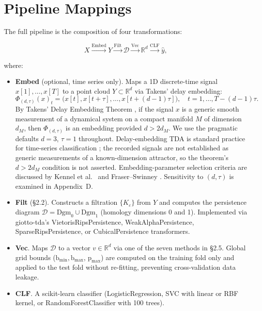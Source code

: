 \documentclass[12pt, a4paper]{report}
\newcommand{\Dgm}{\mathrm{Dgm}}
\newcommand{\birth}{\mathrm{b}}
\newcommand{\pers}{\mathrm{p}}
\newcommand{\R}{\mathbb{R}}
\theoremstyle{definition}
\theoremstyle{plain}
\theoremstyle{remark}
\begin{document}
\section{Pipeline Mappings}

The full pipeline is the composition of four transformations:

\begin{equation}
  X \xrightarrow{\text{Embed}} Y \xrightarrow{\text{Filt}}
  \mathcal{D} \xrightarrow{\text{Vec}} \R^d
  \xrightarrow{\text{CLF}} \hat{y},
  \label{eq:pipeline_map}
\end{equation}

where:

\begin{itemize}
  \item \textbf{Embed} (optional, time series only). Maps a 1D
    discrete-time signal $x[1], \dots, x[T]$ to a point cloud
    $Y \subset \R^d$ via Takens' delay embedding:
    \begin{equation}
      \Phi_{(d,\tau)}(x)_t = \bigl(x[t], x[t+\tau], \dots,
      x[t + (d-1)\tau]\bigr), \quad t = 1, \dots, T - (d-1)\tau.
      \label{eq:takens}
    \end{equation}
    By Takens' Delay Embedding Theorem \cite{takens1981}, if the signal $x$
    is a generic smooth measurement of a dynamical system on a
    compact manifold $M$ of dimension $d_M$, then $\Phi_{(d,\tau)}$
    is an embedding provided $d > 2 d_M$. We use the pragmatic defaults $d = 3$, $\tau = 1$ throughout.
    Delay-embedding TDA is standard practice for time-series
    classification \cite{perea2015,umed2017}; the recorded signals are
    not established as generic measurements of a known-dimension
    attractor, so the theorem's $d > 2 d_M$ condition is not asserted.
    Embedding-parameter selection criteria are discussed by Kennel et
    al.\ \cite{kennel1992} and Fraser--Swinney \cite{fraserswinney1986}.
    Sensitivity to $(d, \tau)$ is examined in Appendix~D.
 \item \textbf{Filt} (\S2.2). Constructs a filtration $\{K_\varepsilon\}$
    from $Y$ and computes the persistence diagram
    $\mathcal{D} = \Dgm_0 \cup \Dgm_1$ (homology dimensions 0 and 1).
    Implemented via giotto-tda's VietorisRipsPersistence,
    WeakAlphaPersistence, SparseRipsPersistence, or
    CubicalPersistence transformers.
  \item \textbf{Vec}. Maps $\mathcal{D}$ to a vector
    $v \in \R^d$ via one of the seven methods in \S2.5. Global grid
    bounds ($\birth_{\min}, \birth_{\max}$, $\pers_{\max}$) are
    computed on the training fold only and applied to the test fold
    without re-fitting, preventing cross-validation data leakage.
  \item \textbf{CLF}. A scikit-learn classifier (LogisticRegression,
    SVC with linear or RBF kernel, or RandomForestClassifier with 100 trees).
\end{itemize}
\end{document}
